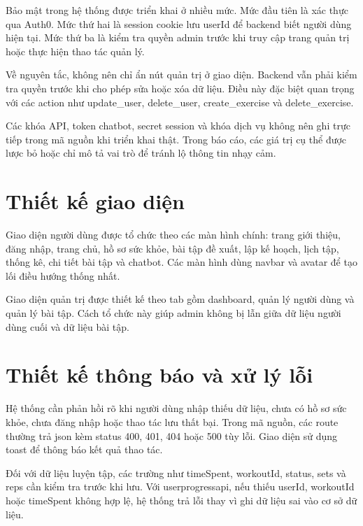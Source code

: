 Bảo mật trong hệ thống được triển khai ở nhiều mức. Mức đầu tiên là xác thực qua Auth0. Mức thứ hai là session cookie lưu userId để backend biết người dùng hiện tại. Mức thứ ba là kiểm tra quyền admin trước khi truy cập trang quản trị hoặc thực hiện thao tác quản lý.


Về nguyên tắc, không nên chỉ ẩn nút quản trị ở giao diện. Backend vẫn phải kiểm tra quyền trước khi cho phép sửa hoặc xóa dữ liệu. Điều này đặc biệt quan trọng với các action như update\_user, delete\_user, create\_exercise và delete\_exercise.


Các khóa API, token chatbot, secret session và khóa dịch vụ không nên ghi trực tiếp trong mã nguồn khi triển khai thật. Trong báo cáo, các giá trị cụ thể được lược bỏ hoặc chỉ mô tả vai trò để tránh lộ thông tin nhạy cảm.


\section{Thiết kế giao diện}

Giao diện người dùng được tổ chức theo các màn hình chính: trang giới thiệu, đăng nhập, trang chủ, hồ sơ sức khỏe, bài tập đề xuất, lập kế hoạch, lịch tập, thống kê, chi tiết bài tập và chatbot. Các màn hình dùng navbar và avatar để tạo lối điều hướng thống nhất.


Giao diện quản trị được thiết kế theo tab gồm dashboard, quản lý người dùng và quản lý bài tập. Cách tổ chức này giúp admin không bị lẫn giữa dữ liệu người dùng cuối và dữ liệu bài tập.


\section{Thiết kế thông báo và xử lý lỗi}

Hệ thống cần phản hồi rõ khi người dùng nhập thiếu dữ liệu, chưa có hồ sơ sức khỏe, chưa đăng nhập hoặc thao tác lưu thất bại. Trong mã nguồn, các route thường trả json kèm status 400, 401, 404 hoặc 500 tùy lỗi. Giao diện sử dụng toast để thông báo kết quả thao tác.


Đối với dữ liệu luyện tập, các trường như timeSpent, workoutId, status, sets và reps cần kiểm tra trước khi lưu. Với userprogressapi, nếu thiếu userId, workoutId hoặc timeSpent không hợp lệ, hệ thống trả lỗi thay vì ghi dữ liệu sai vào cơ sở dữ liệu.

